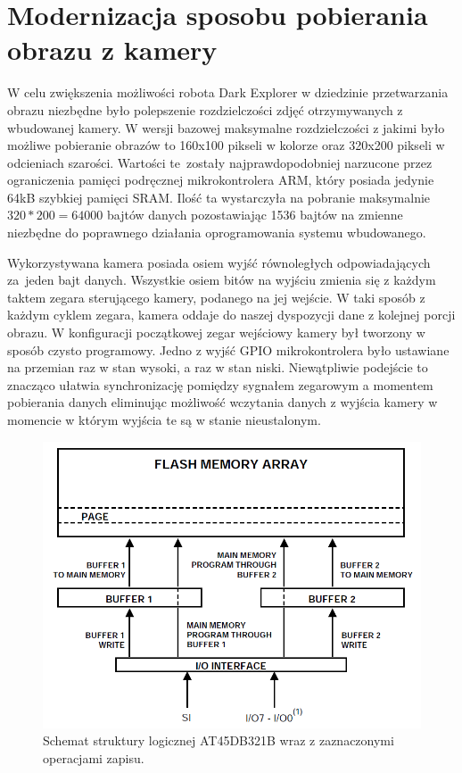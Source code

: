 \section{Modernizacja sposobu pobierania obrazu z kamery} 
\label{sec:img-acq}
W celu zwiększenia możliwości robota Dark Explorer w dziedzinie przetwarzania
obrazu niezbędne było polepszenie rozdzielczości zdjęć otrzymywanych z wbudowanej
kamery. W wersji bazowej maksymalne rozdzielczości z jakimi było możliwe
pobieranie obrazów to 160x100 pikseli w kolorze oraz 320x200 pikseli w odcieniach
szarości. Wartości te~zostały najprawdopodobniej narzucone przez ograniczenia
pamięci podręcznej mikrokontrolera ARM, który posiada jedynie 64kB szybkiej
pamięci SRAM. Ilość ta wystarczyła na pobranie maksymalnie $320*200=64000$ bajtów
danych pozostawiając 1536 bajtów na zmienne niezbędne do poprawnego działania
oprogramowania systemu wbudowanego.

Wykorzystywana kamera posiada osiem wyjść równoległych odpowiadających za~jeden
bajt danych. Wszystkie osiem bitów na wyjściu zmienia się z każdym taktem zegara
sterującego kamery, podanego na jej wejście. W taki sposób z każdym cyklem 
zegara, kamera oddaje do naszej dyspozycji dane z kolejnej porcji obrazu. W
konfiguracji początkowej zegar wejściowy kamery był tworzony w sposób czysto
programowy. Jedno z wyjść GPIO mikrokontrolera było ustawiane na przemian raz w
stan wysoki, a raz w stan niski. Niewątpliwie podejście to znacząco ułatwia
synchronizację pomiędzy sygnałem zegarowym a momentem pobierania danych
eliminując możliwość wczytania danych z wyjścia kamery w momencie w którym
wyjścia te są w stanie nieustalonym.

\begin{figure}[ht!]
 \centering \includegraphics[height=85mm]{../images/ch04/dataflash_structure.png}
 \caption{Schemat struktury logicznej AT45DB321B wraz z zaznaczonymi operacjami zapisu\cite{AT45DB321BApplicationNote}.}
 \label{fig:DataFlashStruct}
\end{figure}

